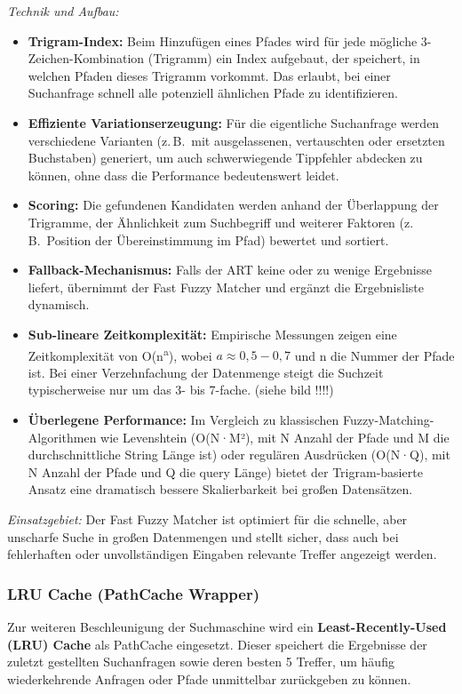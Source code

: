 \textit{Technik und Aufbau:}
\begin{itemize}
	\item \textbf{Trigram-Index:} Beim Hinzufügen eines Pfades wird für jede mögliche 3-Zeichen-Kombination (Trigramm) ein Index aufgebaut, der speichert, in welchen Pfaden dieses Trigramm vorkommt. Das erlaubt, bei einer Suchanfrage schnell alle potenziell ähnlichen Pfade zu identifizieren.
	\item \textbf{Effiziente Variationserzeugung:} Für die eigentliche Suchanfrage werden verschiedene Varianten (z.\,B.\ mit ausgelassenen, vertauschten oder ersetzten Buchstaben) generiert, um auch schwerwiegende Tippfehler abdecken zu können, ohne dass die Performance bedeutenswert leidet.
	\item \textbf{Scoring:} Die gefundenen Kandidaten werden anhand der Überlappung der Trigramme, der Ähnlichkeit zum Suchbegriff und weiterer Faktoren (z.\,B.\ Position der Übereinstimmung im Pfad) bewertet und sortiert.
	\item \textbf{Fallback-Mechanismus:} Falls der ART keine oder zu wenige Ergebnisse liefert, übernimmt der Fast Fuzzy Matcher und ergänzt die Ergebnisliste dynamisch.
	\item \textbf{Sub-lineare Zeitkomplexität:} Empirische Messungen zeigen eine Zeitkomplexität von O(n\textsuperscript{a}), wobei $a \approx 0,5-0,7$ und n die Nummer der Pfade ist. Bei einer Verzehnfachung der Datenmenge steigt die Suchzeit typischerweise nur um das 3- bis 7-fache.
	      (siehe bild !!!!)
	\item \textbf{Überlegene Performance:} Im Vergleich zu klassischen Fuzzy-Matching-Algorithmen wie Levenshtein (O(N·M²), mit N Anzahl der Pfade und M die durchschnittliche String Länge ist) oder regulären Ausdrücken (O(N·Q), mit N Anzahl der Pfade und Q die query Länge) bietet der Trigram-basierte Ansatz eine dramatisch bessere Skalierbarkeit bei großen Datensätzen.
\end{itemize}

\textit{Einsatzgebiet:} Der Fast Fuzzy Matcher ist optimiert für die schnelle, aber unscharfe Suche in großen Datenmengen und stellt sicher, dass auch bei fehlerhaften oder unvollständigen Eingaben relevante Treffer angezeigt werden.

\subsubsection{LRU Cache (PathCache Wrapper)}
Zur weiteren Beschleunigung der Suchmaschine wird ein \textbf{Least-Recently-Used (LRU) Cache} als PathCache eingesetzt. Dieser speichert die Ergebnisse der zuletzt gestellten Suchanfragen sowie deren besten 5 Treffer, um häufig wiederkehrende Anfragen oder Pfade unmittelbar zurückgeben zu können.

